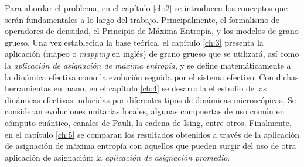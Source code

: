 

Para abordar el problema, en el capítulo \ref{ch:2} se introducen los conceptos que serán fundamentales a lo largo del trabajo. Principalmente, el formalismo de operadores de densidad, el Principio de Máxima Entropía, y los modelos de grano grueso. Una vez establecida la base teórica, el capítulo \ref{ch:3} presenta la aplicación (mapeo o \textit{mapping} en inglés) de grano grueso que se utilizará, así como la \textit{aplicación de asignación de máxima entropía}, y se define matemáticamente a la dinámica efectiva como la evolución seguida por el sistema efectivo. Con dichas herramientas en mano, en el capítulo \ref{ch:4} se desarrolla el estudio de las dinámicas efectivas inducidas por diferentes tipos de dinámicas microscópicas. Se consideran evoluciones unitarias locales, algunas compuertas de uso común en cómputo cuántico, canales de Pauli, la cadena de Ising, entre otros. Finalmente, en el capítulo \ref{ch:5} se comparan los resultados obtenidos a través de la aplicación de asignación de máxima entropía con aquellos que pueden surgir del uso de otra aplicación de asignación: la \textit{aplicación de asignación promedio}.
